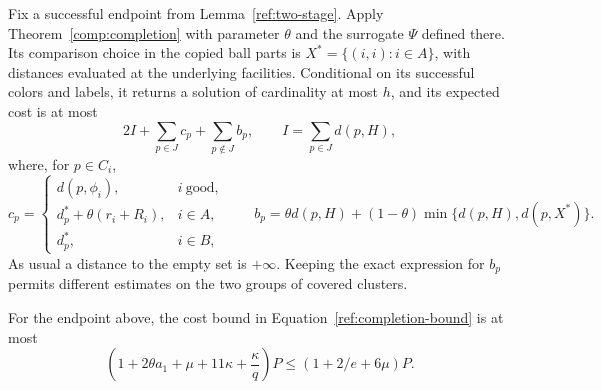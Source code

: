 Fix a successful endpoint from Lemma~\ref{ref:two-stage}.  Apply
Theorem~\ref{comp:completion} with parameter $\theta$ and the surrogate
$\Psi$ defined there.  Its comparison choice in the copied ball parts is
$X^*=\{(i,i):i\in A\}$, with distances evaluated at the underlying
facilities.  Conditional on its successful colors and labels, it
returns a solution of cardinality at most $h$, and its expected cost is at
most
\begin{equation}\label{ref:completion-bound}
 2I+\sum_{p\in J}c_p+\sum_{p\notin J}b_p,
 \qquad I=\sum_{p\in J}d(p,H),
\end{equation}
where, for $p\in C_i$,
\[
 c_p=
 \begin{cases}
   d(p,\phi_i),&i\ \mathrm{good},\\
   d_p^*+\theta(r_i+R_i),&i\in A,\\
   d_p^*,&i\in B,
 \end{cases}
 \qquad
 b_p=\theta d(p,H)+(1-\theta)
       \min\{d(p,H),d(p,X^*)\}.
\]
As usual a distance to the empty set is $+\infty$.  Keeping the exact
expression for $b_p$ permits different estimates on the two groups of
covered clusters.

\begin{lemma}\label{ref:charges}
For the endpoint above, the cost bound in
Equation~\eqref{ref:completion-bound} is at most
\begin{equation}\label{ref:explicit-bound}
 \left(1+2\theta a_1+\mu+11\kappa+\frac\kappa q\right)P
 \le (1+2/e+6\mu)P.
\end{equation}
\end{lemma}

